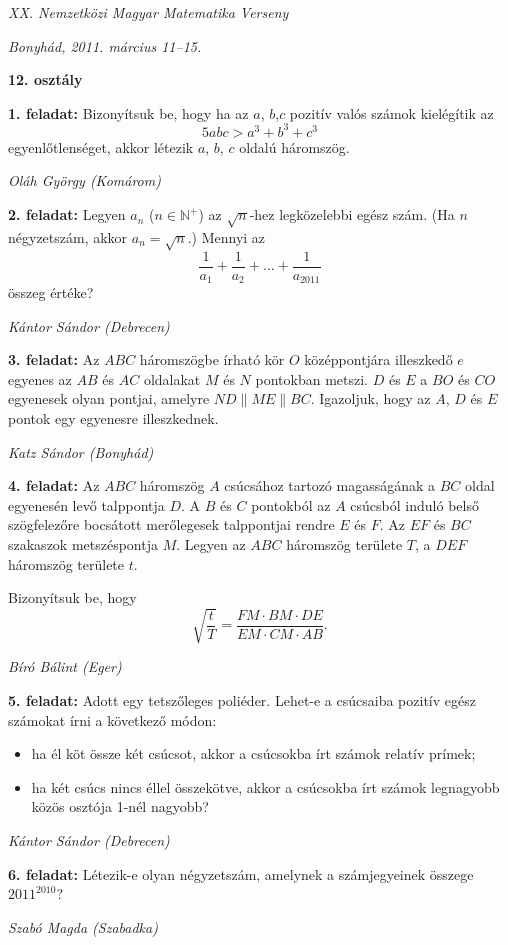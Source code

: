 \documentclass[a4paper,10pt]{article}
\newcommand{\ki}[2]{\hfill {\it #1 (#2)}\medskip}
\begin{document}
\begin{center} \Large {\em XX. Nemzetközi Magyar Matematika Verseny} \end{center}
\begin{center} \large{\em Bonyhád, 2011. március 11--15.} \end{center}
\smallskip
\begin{center} \large{\bf 12. osztály} \end{center}
\bigskip 

{\bf 1. feladat: } 
Bizonyítsuk be, hogy ha az $a$, $b$,$c$ pozitív valós számok kielégítik az
\[5abc>a^3+b^3+c^3\]
egyenlőtlenséget, akkor létezik $a$, $b$, $c$ oldalú háromszög.

\ki{Oláh György}{Komárom}\medskip

{\bf 2. feladat: } 
Legyen $a_n$ ($n\in\mathbb{N}^+$) az $\sqrt{n}$-hez legközelebbi egész szám. (Ha $n$ négyzetszám, akkor $a_n=\sqrt{n}$.) Mennyi az
\[\frac{1}{a_1}+\frac{1}{a_2}+\ldots+\frac{1}{a_{2011}}\]
összeg értéke?

\ki{Kántor Sándor}{Debrecen}\medskip

{\bf 3. feladat: } 
Az $ABC$ háromszögbe írható kör $O$ középpontjára illeszkedő $e$ egyenes az $AB$ és $AC$ oldalakat $M$ és $N$ pontokban metszi. $D$ és $E$ a $BO$ és $CO$ egyenesek olyan pontjai, amelyre $ND\parallel ME\parallel BC$. Igazoljuk, hogy az $A$, $D$ és $E$ pontok egy egyenesre illeszkednek.

\ki{Katz Sándor}{Bonyhád}\medskip

{\bf 4. feladat: } 
Az $ABC$ háromszög $A$ csúcsához tartozó magasságának a $BC$ oldal egyenesén levő talppontja $D$. A $B$ és $C$ pontokból az $A$ csúcsból induló belső szögfelezőre bocsátott merőlegesek talppontjai rendre $E$ és $F$. Az $EF$ és $BC$ szakaszok metszéspontja $M$. Legyen az $ABC$ háromszög területe $T$, a $DEF$ háromszög területe $t$.

Bizonyítsuk be, hogy
\[\sqrt{\frac t T} = \frac{FM \cdot BM \cdot DE}{EM \cdot CM \cdot AB}.\]

\ki{Bíró Bálint}{Eger}\medskip

{\bf 5. feladat: } 
Adott egy tetszőleges poliéder. Lehet-e a csúcsaiba pozitív egész számokat írni a következő módon:
\begin{itemize}
\item[] 
ha él köt össze két csúcsot, akkor a csúcsokba írt számok relatív prímek;
\item[] 
ha két csúcs nincs éllel összekötve, akkor a csúcsokba írt számok legnagyobb közös osztója 1-nél nagyobb?
\end{itemize}

\ki{Kántor Sándor}{Debrecen}\medskip

{\bf 6. feladat: } 
Létezik-e olyan négyzetszám, amelynek a számjegyeinek összege  $2011^{2010}$?

\ki{Szabó Magda}{Szabadka}
\end{document}
